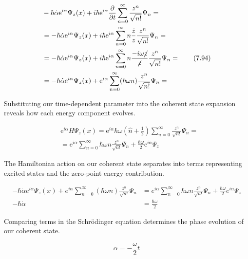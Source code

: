 \documentclass[italian]{HKNdocument}
\begin{document}
\begin{align*}
& -\hbar \dot{\alpha} \mathrm{e}^{i \alpha} \Psi_{z}(x)+i \hbar \mathrm{e}^{i \alpha} \frac{\partial}{\partial t} \sum_{n=0}^{\infty} \frac{z^{n}}{\sqrt{n!}} \Psi_{n}= \\
& =-\hbar \dot{\alpha} \mathrm{e}^{i \alpha} \Psi_{z}(x)+i \hbar \mathrm{e}^{i \alpha} \sum_{n=0}^{\infty} n \frac{\dot{z}}{z} \frac{z^{n}}{\sqrt{n!}} \Psi_{n}= \\
& =-\hbar \dot{\alpha} \mathrm{e}^{i \alpha} \Psi_{z}(x)+i \hbar \mathrm{e}^{i \alpha} \sum_{n=0}^{\infty} n \frac{-i \omega \cancel{z}}{\cancel{z}} \frac{z^{n}}{\sqrt{n!}} \Psi_{n}=  \tag{7.94}\\
& =-\hbar \dot{\alpha} \mathrm{e}^{i \alpha} \Psi_{z}(x)+\mathrm{e}^{i \alpha} \sum_{n=0}^{\infty}(\hbar \omega n) \frac{z^{n}}{\sqrt{n!}} \Psi_{n}=
\end{align*}

Substituting our time-dependent parameter into the coherent state expansion reveals how each energy component evolves.

\begin{align*}
& \mathrm{e}^{i \alpha} H \Psi_{z}(x)=\mathrm{e}^{i \alpha} \hbar \omega\left(\hat{n}+\frac{1}{2}\right) \sum_{n=0}^{\infty} \frac{z^{n}}{\sqrt{n!}} \Psi_{n}=  \tag{7.95}\\
& =\mathrm{e}^{i \alpha} \sum_{n=0}^{\infty} \hbar \omega n \frac{z^{n}}{\sqrt{n!}} \Psi_{n}+\frac{\hbar \omega}{2} \mathrm{e}^{i \alpha} \Psi_{z}
\end{align*}

The Hamiltonian action on our coherent state separates into terms representing excited states and the zero-point energy contribution.

\begin{align*}
-\hbar \dot{\alpha} e^{i \alpha} \Psi_{z}(x)+e^{i \alpha} \sum_{n=0}^{\infty}(\hbar \omega n) \frac{z^{n}}{\sqrt{n!}} \Psi_{n} & =e^{i \alpha} \sum_{n=0}^{\infty} \hbar \omega n \frac{z^{n}}{\sqrt{n!}} \Psi_{n}+\frac{\hbar \omega}{2} e^{i \alpha} \Psi_{z}  \tag{7.96}\\
-\hbar \dot{\alpha} & =\frac{\hbar \omega}{2}
\end{align*}

Comparing terms in the Schrödinger equation determines the phase evolution of our coherent state.

\begin{equation*}
\alpha=-\frac{\omega}{2} t \tag{7.97}
\end{equation*}
\end{document}
